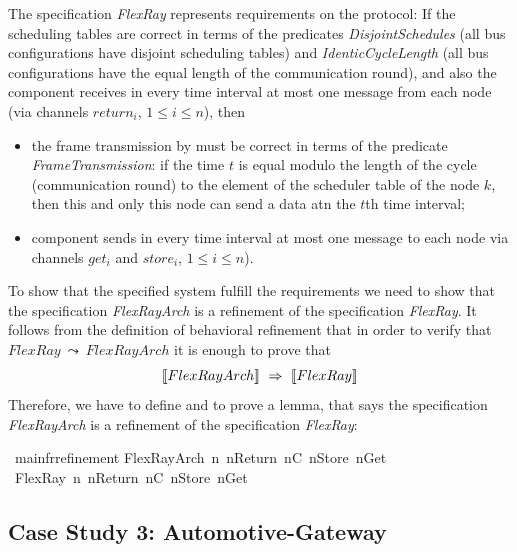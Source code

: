 %
The  specification \emph{FlexRay}  represents requirements on the protocol: 
If the scheduling tables are correct in terms of the predicates 
\emph{Disjoint\-Schedules} (all bus configurations have disjoint scheduling tables) 
and \emph{Identic\-Cycle\-Length} (all bus configurations have the equal length of the communication round), and 
also the \fr component receives in every time interval at most one message from each node 
(via channels $return_i$, $1 \le i \le n$), then
\begin{itemize}
	\item 
	the frame transmission by \fr must be correct in terms of the predicate 
	\emph{FrameTransmission}: if the time $t$ is equal modulo the length of the cycle (\fr communication round) 
to the element of the scheduler table of the node $k$, then this and only this node 
can send a data atn the $t$th time interval;
	\item 
	\fr component sends in every time interval at most one message to each node 
 via channels $get_i$ and $store_i$, $1 \le i \le n$).
\end{itemize}
%
To show that the specified system fulfill the requirements we need to show that
the specification \emph{FlexRayArch} is a refinement of the specification \emph{FlexRay}. 
It follows from the definition of behavioral refinement that in order to verify that 
$
FlexRay~ \leadsto ~ FlexRayArch
$
%
it is enough to prove that
$$
\tlangle FlexRayArch\trangle~ \Rightarrow ~\tlangle FlexRay\trangle
$$
% 
Therefore, we have to define and to prove a lemma, that says the specification 
\emph{FlexRayArch} is a refinement of the specification \emph{FlexRay}:
\\

\begin{isabellebody}%
\isamarkupfalse%
\ main{\isacharunderscore}fr{\isacharunderscore}refinement{\isacharcolon}\isanewline
FlexRayArch\ n\ nReturn\ nC\ nStore\ nGet\ %
{\isasymLongrightarrow}\ FlexRay\ n\ nReturn\ nC\ nStore\ nGet\isanewline
\end{isabellebody}%






\subsection{Case Study 3: Automotive-Gateway}


